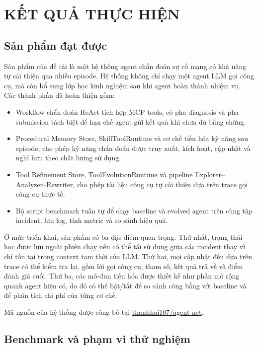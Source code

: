 \section{KẾT QUẢ THỰC HIỆN}

\subsection{Sản phẩm đạt được}

Sản phẩm của đề tài là một hệ thống agent chẩn đoán sự cố mạng có khả năng tự cải thiện qua nhiều episode. Hệ thống không chỉ chạy một agent LLM gọi công cụ, mà còn bổ sung lớp học kinh nghiệm sau khi agent hoàn thành nhiệm vụ. Các thành phần đã hoàn thiện gồm:
\begin{itemize}
  \item Workflow chẩn đoán ReAct tích hợp MCP tools, có pha diagnosis và pha submission tách biệt để hạn chế agent gửi kết quả khi chưa đủ bằng chứng.
  \item Procedural Memory Store, SkillToolRuntime và cơ chế tiến hóa kỹ năng sau episode, cho phép kỹ năng chẩn đoán được truy xuất, kích hoạt, cập nhật và nghỉ hưu theo chất lượng sử dụng.
  \item Tool Refinement Store, ToolEvolutionRuntime và pipeline Explorer--Analyzer--Rewriter, cho phép tài liệu công cụ tự cải thiện dựa trên trace gọi công cụ thực tế.
  \item Bộ script benchmark tuần tự để chạy baseline và evolved agent trên cùng tập incident, lưu log, tính metric và so sánh hiệu quả.
\end{itemize}

Ở mức triển khai, sản phẩm có ba đặc điểm quan trọng. Thứ nhất, trạng thái học được lưu ngoài phiên chạy nên có thể tái sử dụng giữa các incident thay vì chỉ tồn tại trong context tạm thời của LLM. Thứ hai, mọi cập nhật đều dựa trên trace có thể kiểm tra lại, gồm lời gọi công cụ, tham số, kết quả trả về và điểm đánh giá cuối. Thứ ba, các mô-đun tiến hóa được thiết kế như phần mở rộng quanh agent hiện có, do đó có thể bật/tắt để so sánh công bằng với baseline và để phân tích chi phí của từng cơ chế.

Mã nguồn của hệ thống được công bố tại \href{https://github.com/thanhhai107/agent-net}{thanhhai107/agent-net}.

\subsection{Benchmark và phạm vi thử nghiệm}

